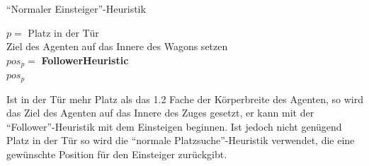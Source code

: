 \begin{algorithm} [H]
	\caption{"`Normaler Einsteiger"'-Heuristik}
	\label{alg:NormalBoarding}
	
	\NormalBoardingHeuristic{} {
		$p=$ Platz in der Tür\\
		 {
			Ziel des Agenten auf das Innere des Wagons setzen \\
			$pos_p = $ \textbf{FollowerHeuristic} \\
		} 
		\Return $pos_p$
	}
\end{algorithm}

Ist in der Tür mehr Platz als das 1.2 Fache der Körperbreite des Agenten, so wird das Ziel des Agenten auf das Innere des Zuges gesetzt, er kann mit der "`Follower"'-Heuristik mit dem Einsteigen beginnen. Ist jedoch nicht genügend Platz in der Tür so wird die "`normale Platzsuche"'-Heuristik verwendet, die eine gewünschte Position für den Einsteiger zurückgibt.
 
